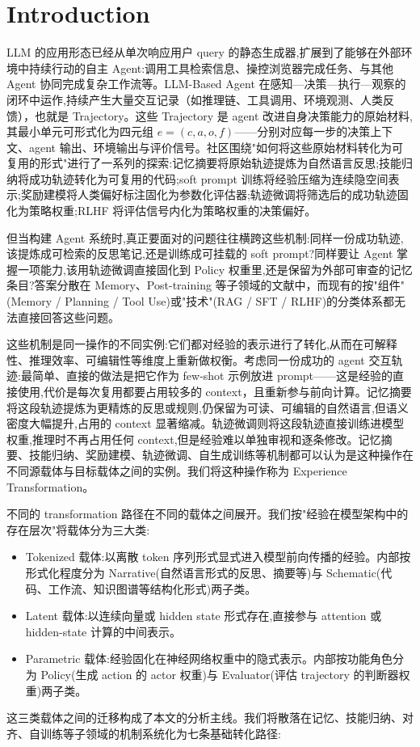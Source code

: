 \section{Introduction}

LLM 的应用形态已经从单次响应用户 query 的静态生成器,扩展到了能够在外部环境中持续行动的自主 Agent:调用工具检索信息、操控浏览器完成任务、与其他 Agent 协同完成复杂工作流等。LLM-Based Agent 在感知—决策—执行—观察的闭环中运作,持续产生大量交互记录（如推理链、工具调用、环境观测、人类反馈），也就是 Trajectory。这些 Trajectory 是 agent 改进自身决策能力的原始材料,其最小单元可形式化为四元组 $e = (c, a, o, f)$——分别对应每一步的决策上下文、agent 输出、环境输出与评价信号。社区围绕"如何将这些原始材料转化为可复用的形式"进行了一系列的探索:记忆摘要将原始轨迹提炼为自然语言反思;技能归纳将成功轨迹转化为可复用的代码;soft prompt 训练将经验压缩为连续隐空间表示;奖励建模将人类偏好标注固化为参数化评估器;轨迹微调将筛选后的成功轨迹固化为策略权重;RLHF 将评估信号内化为策略权重的决策偏好。

但当构建 Agent 系统时,真正要面对的问题往往横跨这些机制:同样一份成功轨迹,该提炼成可检索的反思笔记,还是训练成可挂载的 soft prompt?同样要让 Agent 掌握一项能力,该用轨迹微调直接固化到 Policy 权重里,还是保留为外部可审查的记忆条目?答案分散在 Memory、Post-training 等子领域的文献中，而现有的按"组件"(Memory / Planning / Tool Use)或"技术"(RAG / SFT / RLHF)的分类体系都无法直接回答这些问题。

这些机制是同一操作的不同实例:它们都对经验的表示进行了转化,从而在可解释性、推理效率、可编辑性等维度上重新做权衡。考虑同一份成功的 agent 交互轨迹:最简单、直接的做法是把它作为 few-shot 示例放进 prompt——这是经验的直接使用,代价是每次复用都要占用较多的 context，且重新参与前向计算。记忆摘要将这段轨迹提炼为更精炼的反思或规则,仍保留为可读、可编辑的自然语言,但语义密度大幅提升,占用的 context 显著缩减。轨迹微调则将这段轨迹直接训练进模型权重,推理时不再占用任何 context,但是经验难以单独审视和逐条修改。记忆摘要、技能归纳、奖励建模、轨迹微调、自生成训练等机制都可以认为是这种操作在不同源载体与目标载体之间的实例。我们将这种操作称为 Experience Transformation。

不同的 transformation 路径在不同的载体之间展开。我们按"经验在模型架构中的存在层次"将载体分为三大类:
\begin{itemize}
\item Tokenized 载体:以离散 token 序列形式显式进入模型前向传播的经验。内部按形式化程度分为 Narrative(自然语言形式的反思、摘要等)与 Schematic(代码、工作流、知识图谱等结构化形式)两子类。
\item Latent 载体:以连续向量或 hidden state 形式存在,直接参与 attention 或 hidden-state 计算的中间表示。
\item Parametric 载体:经验固化在神经网络权重中的隐式表示。内部按功能角色分为 Policy(生成 action 的 actor 权重)与 Evaluator(评估 trajectory 的判断器权重)两子类。

\end{itemize}
这三类载体之间的迁移构成了本文的分析主线。我们将散落在记忆、技能归纳、对齐、自训练等子领域的机制系统化为七条基础转化路径:

